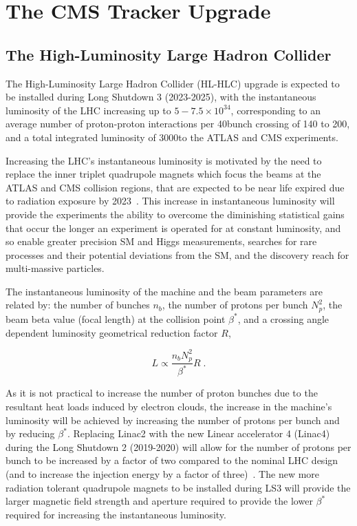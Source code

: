 \chapter{The CMS Tracker Upgrade}\label{chapter:tk-upgrade}
 
\section{The High-Luminosity Large Hadron Collider} \label{sec:hl-lhc}
The High-Luminosity Large Hadron Collider (HL-HLC) upgrade is expected to be installed during Long Shutdown 3 (2023-2025), with the instantaneous luminosity of the LHC increasing up to $5-7.5 \times {10}^{34}$\percms, corresponding to an average number of proton-proton interactions per 40\MHz bunch crossing of 140 to 200, and a total integrated luminosity of 3000\fbinv to the ATLAS and CMS experiments.

Increasing the LHC's instantaneous luminosity is motivated by the need to replace the inner triplet quadrupole magnets which focus the beams at the ATLAS and CMS collision regions, that are expected to be near life expired due to radiation exposure by 2023~\cite{hl-lhc-prelim-design-report,CMSCollaboration:2015zni}.
This increase in instantaneous luminosity will provide the experiments the ability to overcome the diminishing statistical gains that occur the longer an experiment is operated for at constant luminosity, and so enable greater precision SM and Higgs measurements, searches for rare processes and their potential deviations from the SM, and the discovery reach for multi-\TeV massive particles.

The instantaneous luminosity of the machine and the beam parameters are related by: the number of bunches $n_{b}$, the number of protons per bunch $N^{2}_{p}$, the beam beta value (focal length) at the collision point $\beta^{*}$, and a crossing angle dependent luminosity geometrical reduction factor $R$,

\begin{equation}
L \propto \frac{n_{b}N^{2}_{p}}{\beta^{*}} R  \;.
\label{eq:machineLumi}
\end{equation}

As it is not practical to increase the number of proton bunches due to the resultant heat loads induced by electron clouds, the increase in the machine's luminosity will be achieved by increasing the number of protons per bunch and by  reducing $\beta^{*}$.
Replacing Linac2 with the new Linear accelerator 4 (Linac4) during the Long Shutdown 2 (2019-2020) will allow for the number of protons per bunch to be increased by a factor of two compared to the nominal LHC design (and to increase the injection energy by a factor of three)~\cite{linac4}.
The new more radiation tolerant quadrupole magnets to be installed during LS3 will provide the larger magnetic field strength and aperture required to provide the lower $\beta^{*}$ required for increasing the instantaneous luminosity. 

